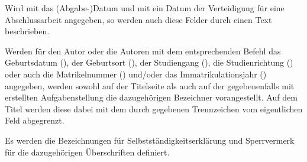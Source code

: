 \begin{Declaration*}{}
\begin{Declaration*}{}
\begin{Declaration*}{}
\begin{Declaration}{}
\begin{Declaration}{}
\printdeclarationlist%
%
%
%
%
%
Wird mit  das (Abgabe-)Datum und mit  ein Datum 
der Verteidigung für eine Abschlussarbeit angegeben, so werden auch diese 
Felder durch einen Text beschrieben.
%
\end{Declaration}
\end{Declaration}

\begin{Declaration}{}
\begin{Declaration}{}
\begin{Declaration}{}
\begin{Declaration}{}
\begin{Declaration}{}
\begin{Declaration}[v2.02]{}
\printdeclarationlist%
%
%
%
Werden für den Autor oder die Autoren mit dem entsprechenden Befehl das 
Geburtsdatum (), der Geburtsort (), der 
Studiengang (), die Studienrichtung () oder 
auch die Matrikelnummer () und/oder das 
Immatrikulationsjahr () angegeben, werden sowohl auf 
der Titelseite als auch auf der gegebenenfalls mit  
erstellten Aufgabenstellung die dazugehörigen Bezeichner vorangestellt. Auf 
dem Titel werden diese dabei mit dem durch  gegebenen 
Trennzeichen vom eigentlichen Feld abgegrenzt.
\end{Declaration}
\end{Declaration}
\end{Declaration}
\end{Declaration}
\end{Declaration}
\end{Declaration}

\begin{Declaration}{}
\begin{Declaration}[v2.02]{}
\printdeclarationlist%
%
%
%
Es werden die Bezeichnungen für Selbstständigkeitserklärung und Sperrvermerk 
für die dazugehörigen Überschriften definiert.
\end{Declaration}
\end{Declaration}


\end{Declaration*}
\end{Declaration*}
\end{Declaration*}
